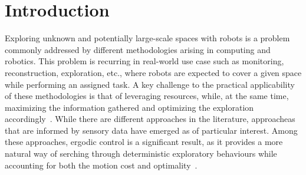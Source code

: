 \documentclass[letterpaper,10pt,conference,twoside]{IEEEtran}
\theoremstyle{definition}
\begin{document}
\section{Introduction}
\noindent
Exploring unknown and potentially large-scale spaces with robots is a problem commonly addressed by different methodologies arising in computing and robotics. This problem is recurring in real-world use case such as monitoring, reconstruction, exploration, etc., where robots are expected to cover a given space while performing an assigned task. A key challenge to the practical applicability of these methodologies is that of leveraging resources, while, at the same time, maximizing the information gathered and optimizing the exploration accordingly~\cite{popovic2020informative,schmid2020efficient}. 
While there are different approaches in the literature, approacheas that are informed by sensory data have emerged as of particular interest. Among these approaches, ergodic control is a significant result, as it provides a more natural way of serching through deterministic exploratory behaviours while accounting for both the motion cost and optimality~\cite{miller2016ergodic}.
\end{document}
